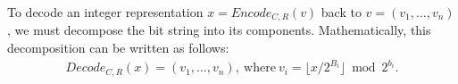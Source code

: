 \documentclass[bibtotoc,halfparskip,oneside]{scrreprt}
\newcommand{\eid}{\mathit{id}\xspace}
\newcommand{\descr}{\mathit{descr}\xspace}
\newcommand{\sk}[1]{\mathit{sk}_{#1}\xspace}
\begin{document}
To decode an integer representation $x=\mathit{Encode}_{C,R}(v)$ back to $v=(v_1,\ldots,v_n)$, we must decompose the bit string into its components. Mathematically, this decomposition can be written as follows:
\begin{align*}
	\mathit{Decode}_{C,R}(x) = (v_1,\ldots,v_n),~\text{where}~	v_i=\lfloor x/2^{B_i} \rfloor \bmod{2^{b_i}}.
\end{align*}



%
%
%
%
%
%


 
\end{document}
